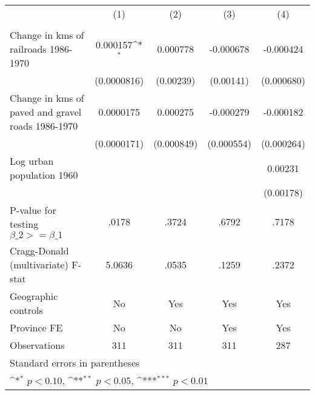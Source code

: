 {
\def\sym#1{\ifmmode^{#1}\else\(^{#1}\)\fi}
\begin{tabular}{l*{4}{c}}
\hline\hline
                &\multicolumn{1}{c}{(1)}&\multicolumn{1}{c}{(2)}&\multicolumn{1}{c}{(3)}&\multicolumn{1}{c}{(4)}\\
                &\multicolumn{1}{c}{}&\multicolumn{1}{c}{}&\multicolumn{1}{c}{}&\multicolumn{1}{c}{}\\
\hline
Change in kms of railroads 1986-1970& 0.000157\sym{*}  & 0.000778         &-0.000678         &-0.000424         \\
                &(0.0000816)         &(0.00239)         &(0.00141)         &(0.000680)         \\
[1em]
Change in kms of paved and gravel roads 1986-1970&0.0000175         & 0.000275         &-0.000279         &-0.000182         \\
                &(0.0000171)         &(0.000849)         &(0.000554)         &(0.000264)         \\
[1em]
Log urban population 1960&                  &                  &                  &  0.00231         \\
                &                  &                  &                  &(0.00178)         \\
\hline
P-value for testing $\beta\_{2} >= \beta\_{1}$&    .0178         &    .3724         &    .6792         &    .7178         \\
Cragg-Donald (multivariate) F-stat&   5.0636         &    .0535         &    .1259         &    .2372         \\
Geographic controls&       No         &      Yes         &      Yes         &      Yes         \\
Province FE     &       No         &       No         &      Yes         &      Yes         \\
Observations    &      311         &      311         &      311         &      287         \\
\hline\hline
\multicolumn{5}{l}{\footnotesize Standard errors in parentheses}\\
\multicolumn{5}{l}{\footnotesize \sym{*} \(p<0.10\), \sym{**} \(p<0.05\), \sym{***} \(p<0.01\)}\\
\end{tabular}
}
